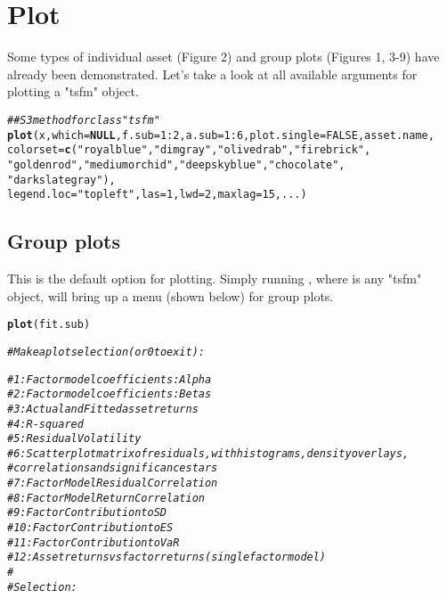 \documentclass[a4paper]{article}\usepackage[]{graphicx}\usepackage[]{color}
\makeatletter
\newcommand{\hlnum}[1]{\textcolor[rgb]{0.686,0.059,0.569}{#1}}%
\newcommand{\hlstr}[1]{\textcolor[rgb]{0.192,0.494,0.8}{#1}}%
\newcommand{\hlcom}[1]{\textcolor[rgb]{0.678,0.584,0.686}{\textit{#1}}}%
\newcommand{\hlopt}[1]{\textcolor[rgb]{0,0,0}{#1}}%
\newcommand{\hlstd}[1]{\textcolor[rgb]{0.345,0.345,0.345}{#1}}%
\newcommand{\hlkwa}[1]{\textcolor[rgb]{0.161,0.373,0.58}{\textbf{#1}}}%
\newcommand{\hlkwc}[1]{\textcolor[rgb]{0.333,0.667,0.333}{#1}}%
\newcommand{\hlkwd}[1]{\textcolor[rgb]{0.737,0.353,0.396}{\textbf{#1}}}%
\newenvironment{kframe}{%
 \def\at@end@of@kframe{}%
 \ifinner\ifhmode%
  \def\at@end@of@kframe{\end{minipage}}%
  \begin{minipage}{\columnwidth}%
 \fi\fi%
 \def\FrameCommand##1{\hskip\@totalleftmargin \hskip-\fboxsep
 \colorbox{shadecolor}{##1}\hskip-\fboxsep
     \hskip-\linewidth \hskip-\@totalleftmargin \hskip\columnwidth}%
 \MakeFramed {\advance\hsize-\width
   \@totalleftmargin\z@ \linewidth\hsize
   \@setminipage}}%
 {\par\unskip\endMakeFramed%
 \at@end@of@kframe}
\newenvironment{knitrout}{}{} %
\makeatother
\begin{document}
\newpage

\section{Plot}

Some types of individual asset (Figure 2) and group plots (Figures 1, 3-9) have already been demonstrated. Let's take a look at all available arguments for plotting a "tsfm" object.
\begin{knitrout}
\color{fgcolor}\begin{kframe}
\begin{alltt}
\hlcom{## S3 method for class "tsfm"}
\hlkwd{plot} \hlstd{(x,} \hlkwc{which}\hlstd{=}\hlkwa{NULL}\hlstd{,} \hlkwc{f.sub}\hlstd{=}\hlnum{1}\hlopt{:}\hlnum{2}\hlstd{,} \hlkwc{a.sub}\hlstd{=}\hlnum{1}\hlopt{:}\hlnum{6}\hlstd{,} \hlkwc{plot.single}\hlstd{=}\hlnum{FALSE}\hlstd{, asset.name,}
      \hlkwc{colorset}\hlstd{=}\hlkwd{c}\hlstd{(}\hlstr{"royalblue"}\hlstd{,}\hlstr{"dimgray"}\hlstd{,}\hlstr{"olivedrab"}\hlstd{,}\hlstr{"firebrick"}\hlstd{,}
                 \hlstr{"goldenrod"}\hlstd{,}\hlstr{"mediumorchid"}\hlstd{,}\hlstr{"deepskyblue"}\hlstd{,}\hlstr{"chocolate"}\hlstd{,}
                 \hlstr{"darkslategray"}\hlstd{),}
      \hlkwc{legend.loc}\hlstd{=}\hlstr{"topleft"}\hlstd{,} \hlkwc{las}\hlstd{=}\hlnum{1}\hlstd{,} \hlkwc{lwd}\hlstd{=}\hlnum{2}\hlstd{,} \hlkwc{maxlag}\hlstd{=}\hlnum{15}\hlstd{, ...)}
\end{alltt}
\end{kframe}
\end{knitrout}

\subsection{Group plots}

This is the default option for plotting. Simply running , where  is any "tsfm" object, will bring up a menu (shown below) for group plots.
\begin{knitrout}
\color{fgcolor}\begin{kframe}
\begin{alltt}
\hlkwd{plot}\hlstd{(fit.sub)}

\hlcom{# Make a plot selection (or 0 to exit): }

\hlcom{#  1: Factor model coefficients: Alpha}
\hlcom{#  2: Factor model coefficients: Betas}
\hlcom{#  3: Actual and Fitted asset returns}
\hlcom{#  4: R-squared}
\hlcom{#  5: Residual Volatility}
\hlcom{#  6: Scatterplot matrix of residuals, with histograms, density overlays, }
\hlcom{#     correlations and significance stars}
\hlcom{#  7: Factor Model Residual Correlation}
\hlcom{#  8: Factor Model Return Correlation}
\hlcom{#  9: Factor Contribution to SD}
\hlcom{# 10: Factor Contribution to ES}
\hlcom{# 11: Factor Contribution to VaR}
\hlcom{# 12: Asset returns vs factor returns (single factor model)}
\hlcom{# }
\hlcom{# Selection: }
\end{alltt}
\end{kframe}
\end{knitrout}
\end{document}
